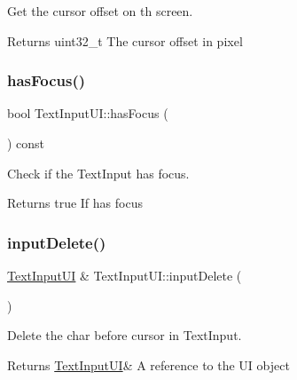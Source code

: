 Get the cursor offset on th screen. 

\begin{DoxyReturn}{Returns}
uint32\+\_\+t The cursor offset in pixel 
\end{DoxyReturn}
\mbox{\label{class_text_input_u_i_a7e514dfb73cea540536ea85260bc55fd}} 
\subsubsection{\texorpdfstring{has\+Focus()}{hasFocus()}}
{\footnotesize\ttfamily bool Text\+Input\+U\+I\+::has\+Focus (\begin{DoxyParamCaption}{ }\end{DoxyParamCaption}) const}



Check if the Text\+Input has focus. 

\begin{DoxyReturn}{Returns}
true If has focus 
\end{DoxyReturn}
\mbox{\label{class_text_input_u_i_ae3a0db51736c336d98655b8384dd78d8}} 
\subsubsection{\texorpdfstring{input\+Delete()}{inputDelete()}}
{\footnotesize\ttfamily \hyperlink{class_text_input_u_i}{Text\+Input\+UI} \& Text\+Input\+U\+I\+::input\+Delete (\begin{DoxyParamCaption}{ }\end{DoxyParamCaption})}



Delete the char before cursor in Text\+Input. 

\begin{DoxyReturn}{Returns}
\hyperlink{class_text_input_u_i}{Text\+Input\+UI}\& A reference to the UI object 
\end{DoxyReturn}
\mbox{\label{class_text_input_u_i_a08c35e5485dc1028c9feece06b0a7dcf}} 
